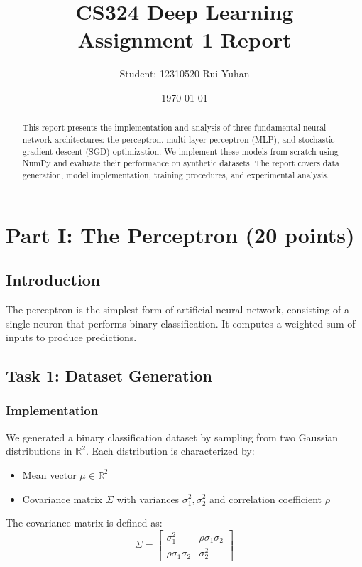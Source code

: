 \documentclass[11pt,a4paper]{article}
\title{CS324 Deep Learning\\Assignment 1 Report}
\author{Student: 12310520 Rui Yuhan}
\date{\today}
\begin{document}
\maketitle

\begin{abstract}
This report presents the implementation and analysis of three fundamental neural network architectures: the perceptron, multi-layer perceptron (MLP), and stochastic gradient descent (SGD) optimization. We implement these models from scratch using NumPy and evaluate their performance on synthetic datasets. The report covers data generation, model implementation, training procedures, and experimental analysis.
\end{abstract}

\tableofcontents
\newpage

\section{Part I: The Perceptron (20 points)}

\subsection{Introduction}
The perceptron is the simplest form of artificial neural network, consisting of a single neuron that performs binary classification. It computes a weighted sum of inputs to produce predictions.

\subsection{Task 1: Dataset Generation}

\subsubsection{Implementation}
We generated a binary classification dataset by sampling from two Gaussian distributions in $\mathbb{R}^2$. Each distribution is characterized by:
\begin{itemize}
    \item Mean vector $\mu \in \mathbb{R}^2$
    \item Covariance matrix $\Sigma$ with variances $\sigma_1^2, \sigma_2^2$ and correlation coefficient $\rho$
\end{itemize}

The covariance matrix is defined as:
\begin{equation}
\Sigma = \begin{bmatrix}
\sigma_1^2 & \rho\sigma_1\sigma_2 \\
\rho\sigma_1\sigma_2 & \sigma_2^2
\end{bmatrix}
\end{equation}
\end{document}
